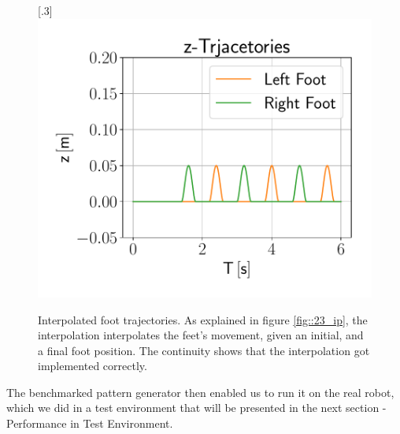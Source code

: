 \begin{figure}[h!]
	[.3\linewidth]{\includegraphics[scale=.3]{chapters/06_walking_experiments/01_user_controlled_walking/01_benchmarking/interpolated_z_trajectories.pdf}}
	\caption{Interpolated foot trajectories. As explained in figure \ref{fig::23_ip}, the interpolation interpolates the feet's movement, given an initial, and a final foot position. The continuity shows that the interpolation got implemented correctly.}
	\label{fig::411_benchmarking_inter}
\end{figure}
 The benchmarked pattern generator then enabled us to run it on the real robot, which we did in a test environment that will be presented in the next section - Performance in Test Environment.
\FloatBarrier

